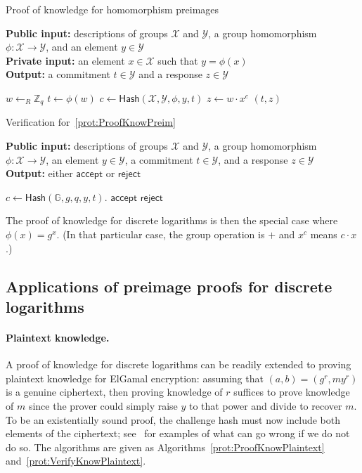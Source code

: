 \documentclass[12pt,a4paper]{article}
\theoremstyle{definition}
\begin{document}
\begin{algorithm}\caption{Proof of knowledge for homomorphism preimages}\label{prot:ProofKnowPreim}
    \textbf{Public input:} descriptions of groups $\mathcal{X}$ and $\mathcal{Y}$, a group homomorphism $\phi:\mathcal{X}\to\mathcal{Y}$, and an element $y\in\mathcal{Y}$\\
    \textbf{Private input:} an element $x\in\mathcal{X}$ such that $y = \phi(x)$\\
    \textbf{Output:} a commitment $t\in\mathcal{Y}$ and a response $z\in\mathcal{Y}$
    \begin{algorithmic}[1]
        \State $w\leftarrow_R\mathbb{Z}_q$
        \State $t \gets \phi(w)$
        \State $c\gets\mathsf{Hash}(\mathcal{X}, \mathcal{Y}, \phi, y, t)$
        \State $z\gets w\cdot x^c$
        \State \Return $(t, z)$
    \end{algorithmic}
\end{algorithm}
\begin{algorithm}\caption{Verification for~\ref{prot:ProofKnowPreim}}\label{prot:VerifyKnowPreim}
    \textbf{Public input:} descriptions of groups $\mathcal{X}$ and $\mathcal{Y}$, a group homomorphism $\phi:\mathcal{X}\to\mathcal{Y}$, an element $y\in\mathcal{Y}$, a commitment $t\in\mathcal{Y}$, and a response $z\in\mathcal{Y}$\\
    \textbf{Output:} either $\mathsf{accept}$ or $\mathsf{reject}$
    \begin{algorithmic}[1]
        \State $c\gets\mathsf{Hash}(\mathbb{G}, g, q, y, t)$.
            \State \Return $\mathsf{accept}$
        \Else
            \State \Return $\mathsf{reject}$
        \EndIf
    \end{algorithmic}
\end{algorithm}

The proof of knowledge for discrete logarithms is then the special case where $\phi(x) = g^x$. (In that particular case, the group operation is $+$ and $x^c$ means $c\cdot x$.)

\subsection{Applications of preimage proofs for discrete logarithms}\label{sec-plaintext-knowledge}
\paragraph{Plaintext knowledge.}
A proof of knowledge for discrete logarithms can be readily extended to proving plaintext knowledge for ElGamal encryption: assuming that $(a, b) = (g^r, my^r)$ is a genuine ciphertext, then proving knowledge of $r$ suffices to prove knowledge of $m$ since the prover could simply raise $y$ to that power and divide to recover $m$. To be an existentially sound proof, the challenge hash must now include both elements of the ciphertext; see~\cite{mcmurtry2020test} for examples of what can go wrong if we do not do so. The algorithms are given as Algorithms~\ref{prot:ProofKnowPlaintext} and~\ref{prot:VerifyKnowPlaintext}.
\end{document}
